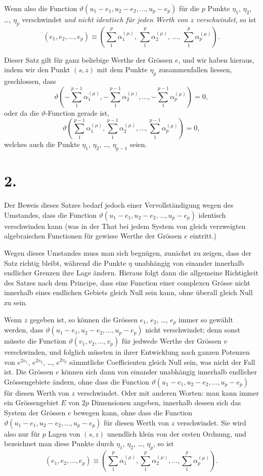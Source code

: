 \documentclass{article}
\begin{document}
Wenn also die Function $\vartheta(u_1-e_1, u_2-e_2, \dots, u_p-e_p)$ für die $p$ Punkte $\eta_1$, $\eta_2$, \dots, $\eta_p$ verschwindet \emph{und nicht identisch für jeden Werth von $z$ verschwindet}, so ist
\[
(e_1, e_2, \dots, e_p) \equiv \left(\sum_1^p \alpha_1^{(\mu)},\, \sum_1^p \alpha_2^{(\mu)},\, \dots,\, \sum_1^p \alpha_p^{(\mu)}\right).
\]

Dieser Satz gilt für ganz beliebige Werthe der Grössen $e$, und wir haben hieraus, indem wir den Punkt $(s, z)$ mit dem Punkte $\eta_p$ zusammenfallen liessen, geschlossen, dass
\[
\vartheta\left(-\sum_1^{p-1} \alpha_1^{(\mu)}, -\sum_1^{p-1} \alpha_2^{(\mu)}, \dots, -\sum_1^{p-1} \alpha_p^{(\mu)}\right) = 0,
\]
oder da die $\vartheta$-Function gerade ist,
\[
\vartheta\left(\sum_1^{p-1} \alpha_1^{(\mu)}, \sum_1^{p-1} \alpha_2^{(\mu)}, \dots, \sum_1^{p-1} \alpha_p^{(\mu)}\right) = 0,
\]
welches auch die Punkte $\eta_1$, $\eta_2$, \dots, $\eta_{p-1}$ seien.

\section*{2.}

Der Beweis dieses Satzes bedarf jedoch einer Vervollständigung wegen des Umstandes, dass die Function $\vartheta(u_1-e_1, u_2-e_2, \dots, u_p-e_p)$ identisch verschwinden kann (was in der That bei jedem System von gleich verzweigten algebraischen Functionen für gewisse Werthe der Grössen $e$ eintritt.)

Wegen dieses Umstandes muss man sich begnügen, zunächst zu zeigen, dass der Satz richtig bleibt, während die Punkte $\eta$ unabhängig von einander innerhalb endlicher Grenzen ihre Lage ändern. Hieraus folgt dann die allgemeine Richtigkeit des Satzes nach dem Principe, dass eine Function einer complexen Grösse nicht innerhalb eines endlichen Gebiets gleich Null sein kann, ohne überall gleich Null zu sein.

Wenn $z$ gegeben ist, so können die Grössen $e_1$, $e_2$, \dots, $e_p$ immer so gewählt werden, dass $\vartheta(u_1-e_1, u_2-e_2, \dots, u_p-e_p)$ nicht verschwindet; denn sonst müsste die Function $\vartheta(v_1, v_2, \dots, v_p)$ für jedwede Werthe der Grössen $v$ verschwinden, und folglich müssten in ihrer Entwicklung nach ganzen Potenzen von $e^{2v_1}$, $e^{2v_2}$, \dots, $e^{2v_p}$ sämmtliche Coefficienten gleich Null sein, was nicht der Fall ist. Die Grössen $e$ können sich dann von einander unabhängig innerhalb endlicher Grössengebiete ändern, ohne dass die Function $\vartheta(u_1-e_1, u_2-e_2, \dots, u_p-e_p)$ für diesen Werth von $z$ verschwindet. Oder mit anderen Worten: man kann immer ein Grössengebiet $E$ von $2p$ Dimensionen angeben, innerhalb dessen sich das System der Grössen $e$ bewegen kann, ohne dass die Function $\vartheta(u_1-e_1, u_2-e_2, \dots, u_p-e_p)$ für diesen Werth von $z$ verschwindet. Sie wird also nur für $p$ Lagen von $(s, z)$ unendlich klein von der ersten Ordnung, und bezeichnet man diese Punkte durch $\eta_1$, $\eta_2$, \dots, $\eta_p$, so ist
\[
\tag{(1.)}
(e_1, e_2, \dots, e_p) \equiv \left(\sum_1^p \alpha_1^{(\mu)}, \sum_1^p \alpha_2^{(\mu)}, \dots, \sum_1^p \alpha_p^{(\mu)}\right).
\]
\end{document}
